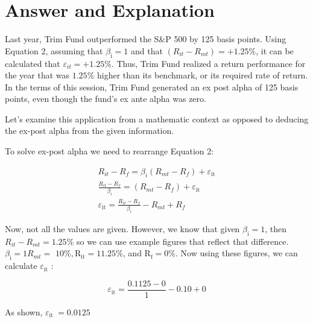 \documentclass[11pt]{article}
\begin{document}
\section*{Answer and Explanation}
Last year, Trim Fund outperformed the S\&P 500 by 125 basis points. Using Equation 2, assuming that $\beta_{\mathrm{i}}=1$ and that $\left(R_{i t}-R_{m t}\right)=+1.25 \%$, it can be calculated that $\varepsilon_{i t}=+1.25 \%$. Thus, Trim Fund realized a return performance for the year that was $1.25 \%$ higher than its benchmark, or its required rate of return. In the terms of this session, Trim Fund generated an ex post alpha of 125 basis points, even though the fund's ex ante alpha was zero.

Let's examine this application from a mathematic context as opposed to deducing the ex-post alpha from the given information.

To solve ex-post alpha we need to rearrange Equation 2:

$$
\begin{gathered}
R_{i t}-R_{f}=\beta_{i}\left(R_{m t}-R_{f}\right)+\varepsilon_{\mathrm{it}} \\
\frac{R_{i t}-R_{f}}{\beta_{i}}=\left(R_{m t}-R_{f}\right)+\varepsilon_{\mathrm{it}} \\
\varepsilon_{\mathrm{it}}=\frac{R_{i t}-R_{f}}{\beta_{i}}-R_{m t}+R_{f}
\end{gathered}
$$

Now, not all the values are given. However, we know that given $\beta_{\mathrm{i}}=1$, then $R_{i t}-R_{m t}=1.25 \%$ so we can use example figures that reflect that difference. $\beta_{\mathrm{i}}=1 R_{m t}=$ $10 \%, \mathrm{R}_{\mathrm{it}}=11.25 \%$, and $\mathrm{R}_{\mathrm{f}}=0 \%$. Now using these figures, we can calculate $\varepsilon_{\mathrm{it}}$ :

$$
\varepsilon_{\mathrm{it}}=\frac{0.1125-0}{1}-0.10+0
$$

As shown, $\varepsilon_{\text {it }}=0.0125$
\end{document}
